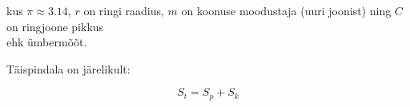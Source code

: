 \begin{center}
{{{\begin{flushleft}

\hspace{5mm}
kus $\pi \approx 3.14$, $r$ on ringi raadius, $m$ on koonuse moodustaja (uuri joonist) ning $C$ on ringjoone pikkus\\ \hspace{5mm} ehk ümbermõõt.

\vspace{2mm}
\hspace{5mm}
Täispindala on järelikult:

\begin{equation}
\label{43_eq7}
\boxed{S_{t}=S_{p}+S_{k}}
\end{equation}

\end{flushleft}
}}}
\end{center}



